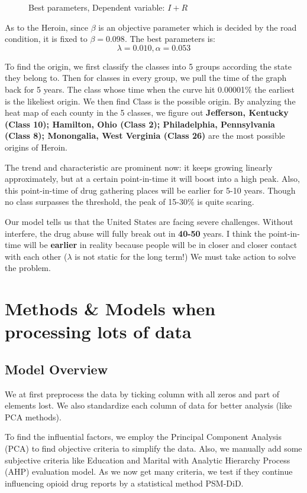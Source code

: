 \documentclass{mcmthesis}
\begin{document}
\begin{figure}[htbp!]
\begin{flushleft}
\begin{minipage}[t]{0.3\textwidth}
  \caption{Best parameters, Dependent variable: $I+R$}
  \end{minipage}
  \end{flushleft}
  
\end{figure}

As to the Heroin, since $\beta$ is an objective parameter which is decided by the road condition, it is fixed to $\beta=0.098$. The best parameters is:
$$\lambda=0.010, \alpha=0.053$$

To find the origin, we first classify the classes into 5 groups according the state they belong to. Then for classes in every group, we pull the time of the graph back for 5 years. The class whose time when the curve hit 0.00001\% the earliest is the likeliest origin. We then find Class is the possible origin. By analyzing the heat map of each county in the 5 classes, we figure out \textbf{Jefferson, Kentucky (Class 10); Hamilton, Ohio (Class 2); Philadelphia, Pennsylvania (Class 8); Monongalia, West Verginia (Class 26)} are the most possible origins of Heroin.

The trend and characteristic are prominent now: it keeps growing linearly approximately, but at a certain point-in-time it will boost into a high peak. Also, this point-in-time of drug gathering places will be earlier for 5-10 years. Though no class surpasses the threshold, the peak of 15-30\% is quite scaring.

Our model tells us that the United States are facing severe challenges. Without interfere,  the drug abuse will fully break out in \textbf{40-50} years. I think the point-in-time will be \textbf{earlier} in reality because people will be in closer and closer contact with each other ($\lambda$ is not static for the long term!) We must take action to solve the problem. 



\section{Methods \& Models when processing lots of data}
\subsection{Model Overview}
We at first preprocess the data by ticking column with all zeros and part of elements lost. We also standardize each column of data for better analysis (like PCA methods).

To find the influential factors, we employ the Principal Component Analysis (PCA) to find objective criteria to simplify the data. Also, we manually add some subjective criteria like Education and Marital with Analytic Hierarchy Process (AHP) evaluation model. As we now get many criteria, we test if they continue influencing opioid drug reports by a statistical method PSM-DiD. 
\end{document}
